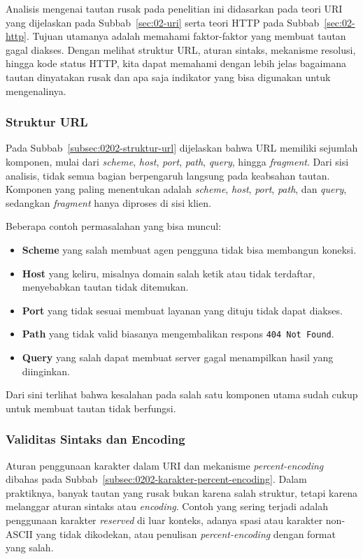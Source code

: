 
Analisis mengenai tautan rusak pada penelitian ini didasarkan pada teori URI yang dijelaskan pada Subbab~\ref{sec:02-uri} serta teori HTTP pada Subbab~\ref{sec:02-http}. Tujuan utamanya adalah memahami faktor-faktor yang membuat tautan gagal diakses. Dengan melihat struktur URL, aturan sintaks, mekanisme resolusi, hingga kode status HTTP, kita dapat memahami dengan lebih jelas bagaimana tautan dinyatakan rusak dan apa saja indikator yang bisa digunakan untuk mengenalinya.

\subsubsection*{Struktur URL}
Pada Subbab~\ref{subsec:0202-struktur-url} dijelaskan bahwa URL memiliki sejumlah komponen, mulai dari \textit{scheme}, \textit{host}, \textit{port}, \textit{path}, \textit{query}, hingga \textit{fragment}. Dari sisi analisis, tidak semua bagian berpengaruh langsung pada keabsahan tautan. Komponen yang paling menentukan adalah \textit{scheme}, \textit{host}, \textit{port}, \textit{path}, dan \textit{query}, sedangkan \textit{fragment} hanya diproses di sisi klien.

Beberapa contoh permasalahan yang bisa muncul:
\begin{itemize}
  \item \textbf{Scheme} yang salah membuat agen pengguna tidak bisa membangun koneksi.
  \item \textbf{Host} yang keliru, misalnya domain salah ketik atau tidak terdaftar, menyebabkan tautan tidak ditemukan.
  \item \textbf{Port} yang tidak sesuai membuat layanan yang dituju tidak dapat diakses.
  \item \textbf{Path} yang tidak valid biasanya mengembalikan respons \texttt{404 Not Found}.
  \item \textbf{Query} yang salah dapat membuat server gagal menampilkan hasil yang diinginkan.
\end{itemize}

Dari sini terlihat bahwa kesalahan pada salah satu komponen utama sudah cukup untuk membuat tautan tidak berfungsi.

\subsubsection*{Validitas Sintaks dan Encoding}
Aturan penggunaan karakter dalam URI dan mekanisme \textit{percent-encoding} dibahas pada Subbab~\ref{subsec:0202-karakter-percent-encoding}. Dalam praktiknya, banyak tautan yang rusak bukan karena salah struktur, tetapi karena melanggar aturan sintaks atau \textit{encoding}. Contoh yang sering terjadi adalah penggunaan karakter \textit{reserved} di luar konteks, adanya spasi atau karakter non-ASCII yang tidak dikodekan, atau penulisan \textit{percent-encoding} dengan format yang salah.

